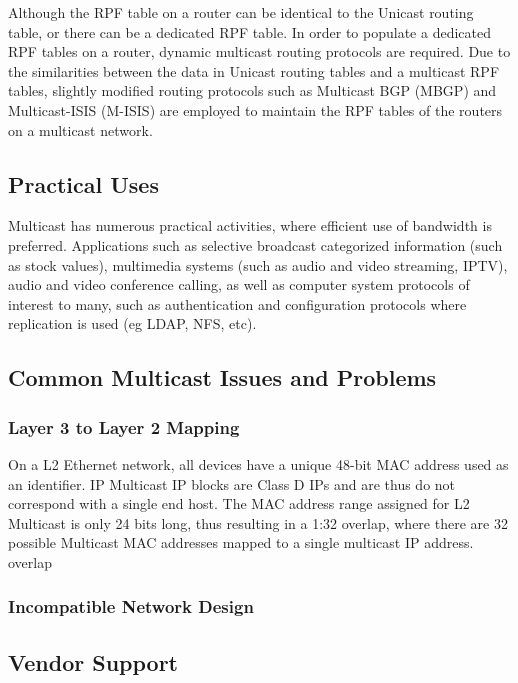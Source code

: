Although the RPF table on a router can be identical to the Unicast
routing table, or there can be a dedicated RPF table. In order to 
populate a dedicated RPF tables on a router, dynamic multicast 
routing protocols are required. Due to the similarities between the data
in Unicast routing tables and a multicast RPF tables, slightly modified
routing protocols such as Multicast BGP (MBGP) and Multicast-ISIS
(M-ISIS) are employed to maintain the RPF tables of the routers on a
multicast network.

\subsection{Practical Uses}

Multicast has numerous practical activities, where efficient use of
bandwidth is preferred. Applications such as selective broadcast
categorized information (such as stock values), multimedia systems (such
as audio and video streaming, IPTV), audio and video conference calling, 
as well as computer system protocols of interest to many, such as
authentication and configuration protocols where replication is
used (eg LDAP, NFS, etc).

\subsection{Common Multicast Issues and Problems}

\subsubsection{Layer 3 to Layer 2 Mapping}

On a L2 Ethernet network, all devices have a unique 48-bit MAC address
used as an identifier. IP Multicast IP blocks are Class D IPs and are 
thus do not correspond with a single end host. The MAC address range
assigned for L2 Multicast is only 24 bits long, thus resulting in a 1:32
overlap, where there are 32 possible Multicast MAC addresses mapped to a 
single multicast IP address.
overlap

\subsubsection{Incompatible Network Design}


\subsection{Vendor Support}

